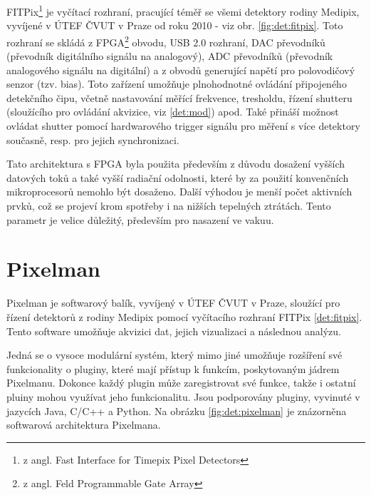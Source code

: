FITPix\footnote{z angl. Fast Interface for Timepix Pixel Detectors} \cite{fitpix} je vyčítací rozhraní, pracující téměř se všemi detektory rodiny Medipix, vyvíjené v ÚTEF ČVUT v Praze od roku 2010 - viz obr. \ref{fig:det:fitpix}. Toto rozhraní se skládá z FPGA\footnote{z angl. Feld Programmable Gate Array} obvodu, USB 2.0 rozhraní, DAC převodníků (převodník digitálního signálu na analogový), ADC převodníků (převodník analogového signálu na digitální) a z obvodů generující napětí pro polovodičový senzor (tzv. bias). Toto zařízení umožňuje plnohodnotné ovládání připojeného detekčního čipu, včetně nastavování měřící frekvence, tresholdu, řízení shutteru (sloužícího pro ovládání akvizice, viz \ref{det:mod}) apod. Také přináší možnost ovládat shutter pomocí hardwarového trigger signálu pro měření s více detektory současně, resp. pro jejich synchronizaci.

Tato architektura s FPGA byla použita především z důvodu dosažení vyšších datových toků a také vyšší radiační odolnosti, které by za použití konvenčních mikroprocesorů nemohlo být dosaženo. Další výhodou je menší počet aktivních prvků, což se projeví krom spotřeby i na nižších tepelných ztrátách. Tento parametr je velice důležitý, především pro nasazení ve vakuu.

\section{Pixelman}\label{det:pixelman}
Pixelman \cite{pixelman} je softwarový balík, vyvíjený v ÚTEF ČVUT v Praze, sloužící pro řízení detektorů z rodiny Medipix pomocí vyčítacího rozhraní FITPix \ref{det:fitpix}. Tento software umožňuje akvizici dat, jejich vizualizaci a následnou analýzu.

Jedná se o vysoce modulární systém, který mimo jiné umožňuje rozšíření své funkcionality o pluginy, které mají přístup k funkcím, poskytovaným jádrem Pixelmanu. Dokonce každý plugin může zaregistrovat své funkce, takže i ostatní pluiny mohou využívat jeho funkcionalitu. Jsou podporovány pluginy, vyvinuté v jazycích Java, C/C++ a Python. Na obrázku \ref{fig:det:pixelman} je znázorněna softwarová architektura Pixelmana.

